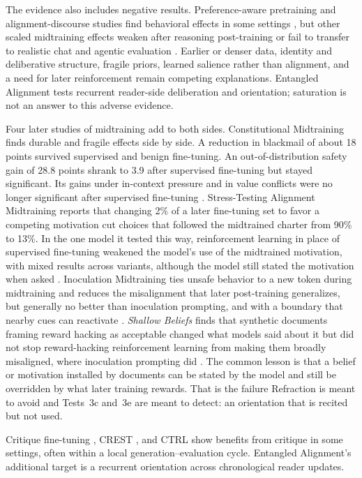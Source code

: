 \documentclass[11pt]{article}
\begin{document}
The evidence also includes negative results. Preference-aware pretraining
and alignment-discourse studies find behavioral effects in some settings
\cite{korbak2023pretraining,betley2025alignment}, but other scaled midtraining
effects weaken after reasoning post-training or fail to transfer to realistic
chat and agentic evaluation \cite{openai2026midtraining}. Earlier or denser
data, identity and deliberative structure, fragile priors, learned salience
rather than alignment, and a need for later reinforcement remain competing
explanations. Entangled Alignment tests recurrent reader-side deliberation and orientation;
saturation is not an answer to this adverse evidence.

Four later studies of midtraining add to both sides. Constitutional
Midtraining finds durable and fragile effects side by side. A reduction in
blackmail of about 18 points survived supervised and benign fine-tuning. An
out-of-distribution safety gain of 28.8 points shrank to 3.9 after supervised
fine-tuning but stayed significant. Its gains under in-context pressure and in
value conflicts were no longer significant after supervised fine-tuning
\cite{cho2026constitutionalmidtraining}. Stress-Testing Alignment
Midtraining reports that changing 2\% of a later fine-tuning set to favor a
competing motivation cut choices that followed the midtrained charter from
90\% to 13\%. In the one model it tested this way, reinforcement learning in
place of supervised fine-tuning weakened the model's use of the midtrained
motivation, with mixed results across variants, although the model still
stated the motivation when asked \cite{baines2026stresstesting}. Inoculation
Midtraining ties unsafe behavior to a new token during midtraining and reduces
the misalignment that later post-training generalizes, but generally no better
than inoculation prompting, and with a boundary that nearby cues can reactivate
\cite{obrien2026inoculationmidtraining}. \emph{Shallow Beliefs} finds that
synthetic documents framing reward hacking as acceptable changed what models
said about it but did not stop reward-hacking reinforcement learning from
making them broadly misaligned, where inoculation prompting did
\cite{jose2026shallowbeliefs}. The common lesson is that a belief or
motivation installed by documents can be stated by the model and still be
overridden by what later training rewards. That is the failure Refraction is
meant to avoid and Tests~3c and~3e are meant to detect: an orientation that is
recited but not used.

Critique fine-tuning \cite{wang2025critiquefinetuninglearningcritique},
CREST \cite{lee2025selftrainingmeetsconsistencyimproving}, and CTRL
\cite{xie2025teachinglanguagemodelscritique} show benefits from critique in
some settings, often within a local generation--evaluation cycle. Entangled Alignment's
additional target is a recurrent orientation across chronological reader
updates.
\end{document}
